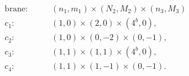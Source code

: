 \begin{equation}
\begin{aligned}
\text{brane:} \qquad & (n_1,m_1) \times (N_2,M_2) \times (n_3,M_3)\\
c_1:  \qquad & (1,0)\times (2,0) \times (4^b,0),\\
c_2:  \qquad & (1,0)\times (0,-2) \times (0,-1),\\
c_3:  \qquad & (1,1)\times (1,1) \times (4^b,0),\\
c_4:  \qquad & (1,1)\times (1,-1) \times  (0,-1).
\end{aligned}\label{AppWrapFillerBranes}
\end{equation}

